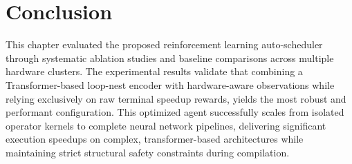 \section{Conclusion}
\label{sec:conclusion}
This chapter evaluated the proposed reinforcement learning auto-scheduler through systematic ablation studies and baseline comparisons across multiple hardware clusters. The experimental results validate that combining a Transformer-based loop-nest encoder with hardware-aware observations while relying exclusively on raw terminal speedup rewards, yields the most robust and performant configuration. This optimized agent successfully scales from isolated operator kernels to complete neural network pipelines, delivering significant execution speedups on complex, transformer-based architectures while maintaining strict structural safety constraints during compilation.